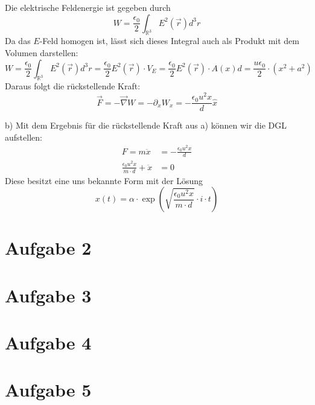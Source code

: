 \documentclass[11pt a4paper]{article}
\newcommand{\epsz}{\epsilon_0}
\begin{document}
Die elektrische Feldenergie ist gegeben durch
\[
	W = \frac{\epsz}{2} \int_{\mathbb{R}^3} E^2(\vec r) d^3r 
\]
Da das $E$-Feld homogen ist, lässt sich dieses Integral auch als Produkt 
mit dem Volumen darstellen:
\[
	W = \frac{\epsz}{2} \int_{\mathbb{R}^3} E^2(\vec r) d^3r 
	= 
	\frac{\epsz}{2} E^2(\vec r) \cdot V_{E}
	= 
	\frac{\epsz}{2} E^2(\vec r) \cdot A(x)d
	=
	\frac{u \epsz}{2} \cdot (x^2 + a^2)
\]
Daraus folgt die rückstellende Kraft:
\[
	\vec F = -\vec\nabla W = -\partial_x W_x 
	= -\frac{\epsz u^2 x}{d} \hat x
\]

\newpage
\setlength{\headheight}{0cm}

b) Mit dem Ergebnis für die rückstellende Kraft aus a) können wir die DGL 
aufstellen:
\begin{align*}
	F = m\ddot x&=-\frac{\epsz u^2 x}{d}  \\
	\frac{\epsz u^2 x}{m \cdot d} + \ddot x &= 0
\end{align*}
Diese besitzt eine uns bekannte Form mit der Lösung
\[
	x(t) = \alpha \cdot \exp\left(
	\sqrt{\frac{\epsz u^2 x}{m \cdot d}} \cdot i \cdot t
	\right)
\]

\section*{Aufgabe 2}
\section*{Aufgabe 3}
\section*{Aufgabe 4}
\section*{Aufgabe 5}
\end{document}
